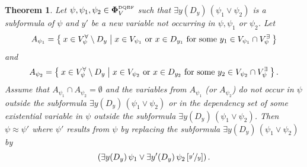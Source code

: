 \documentclass[
  digital, %
  color,
  twoside, %
  table,   %
  nolof,     %
  nolot,     %
]{fithesis3}
\newtheorem{theorem}{Theorem}[chapter] %
\theoremstyle{definition}
\theoremstyle{remark}
\newcommand{\substitute}[2]{\left[ \nicefrac{#2}{#1} \right]}
\newcommand{\DQBF}[1]{\mathbf{\Phi}_{#1}^{\normalfont{\text{\tiny DQBF}}}}
\newcommand{\vars}[1]{V_{#1}}
\newcommand{\evars}[1]{V_{#1}^{\exists}}
\newcommand{\uvars}[1]{V_{#1}^{\forall}}
\newcommand{\fvars}[1]{V_{#1}^{\mathrm{free}}}
\newcommand{\itholds}{\,}
\begin{document}
\begin{theorem}
  \label{thrm:localisedijunction}
  Let $\psi,\psi_1,\psi_2 \in \DQBF{V}$ such that $\exists y(D_y) \itholds (\psi_1 \lor \psi_2)$ is a subformula of $\psi$ and $y'$ be a new variable not occurring in $\psi, \psi_1$ or $\psi_2$. Let 
  \[A_{\psi_1} = \Set{x \in \uvars{\psi} \setminus D_y | x \in \vars{\psi_1} \text{ or } x \in D_{y_1} \text{ for some } y_1 \in \vars{\psi_1} \cap \evars{\psi}}\]
  and 
  \[A_{\psi_2} = \Set{x \in \uvars{\psi} \setminus D_y | x \in \vars{\psi_2} \text{ or } x \in D_{y_2} \text{ for some } y_2 \in \vars{\psi_2} \cap \evars{\psi}}.\] 
  Assume that $A_{\psi_1} \cap A_{\psi_2} = \emptyset$ and the variables from $A_{\psi_1}$ (or $A_{\psi_2}$) do not occur in $\psi$ outside the subformula $\exists y(D_y) \itholds (\psi_1 \lor \psi_2)$ or in the dependency set of some existential variable in $\psi$ outside the subformula $\exists y(D_y) \itholds (\psi_1 \lor \psi_2)$. Then $\psi \approx \psi'$ where $\psi'$ results from $\psi$ by replacing the subformula $\exists y(D_y) \itholds (\psi_1 \lor \psi_2)$ by \[\left(\exists y(D_y) \itholds \psi_1 \lor \exists y'(D_y) \itholds \psi_2\substitute{y}{y'}\right).\]
\end{theorem}
\end{document}

